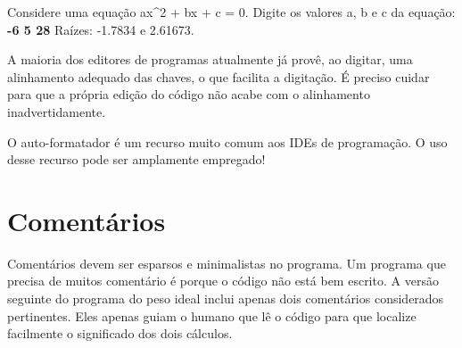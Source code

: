 \documentclass[
  11pt,
  a4paper,
]{scrbook}
\newenvironment{Shaded}{\begin{snugshade}}{\end{snugshade}}
\newcommand{\KeywordTok}[1]{\textcolor[rgb]{0.13,0.29,0.53}{\textbf{#1}}}
\newcommand{\NormalTok}[1]{#1}
\begin{document}
\begin{Shaded}
\begin{Highlighting}[]
\NormalTok{Considere uma equação ax\^{}2 + bx + c = 0.}
\NormalTok{Digite os valores a, b e c da equação: }\KeywordTok{ {-}6 5 28 }
\NormalTok{Raízes: {-}1.7834 e 2.61673.}
\end{Highlighting}
\end{Shaded}

\begin{tcolorbox}[enhanced jigsaw, arc=.35mm, bottomtitle=1mm, colbacktitle=quarto-callout-tip-color!10!white, title=\textcolor{quarto-callout-tip-color}{\faLightbulb}\hspace{0.5em}{Dica}, toprule=.15mm, left=2mm, opacityback=0, colback=white, colframe=quarto-callout-tip-color-frame, opacitybacktitle=0.6, bottomrule=.15mm, leftrule=.75mm, toptitle=1mm, coltitle=black, titlerule=0mm, rightrule=.15mm, breakable]

A maioria dos editores de programas atualmente já provê, ao digitar, uma
alinhamento adequado das chaves, o que facilita a digitação. É preciso
cuidar para que a própria edição do código não acabe com o alinhamento
inadvertidamente.

\end{tcolorbox}

\begin{tcolorbox}[enhanced jigsaw, arc=.35mm, bottomtitle=1mm, colbacktitle=quarto-callout-tip-color!10!white, title=\textcolor{quarto-callout-tip-color}{\faLightbulb}\hspace{0.5em}{Dica}, toprule=.15mm, left=2mm, opacityback=0, colback=white, colframe=quarto-callout-tip-color-frame, opacitybacktitle=0.6, bottomrule=.15mm, leftrule=.75mm, toptitle=1mm, coltitle=black, titlerule=0mm, rightrule=.15mm, breakable]

O auto-formatador é um recurso muito comum aos IDEs de programação. O
uso desse recurso pode ser amplamente empregado!

\end{tcolorbox}

\section{Comentários}\label{comentuxe1rios}

Comentários devem ser esparsos e minimalistas no programa. Um programa
que precisa de muitos comentário é porque o código não está bem escrito.
A versão seguinte do programa do peso ideal inclui apenas dois
comentários considerados pertinentes. Eles apenas guiam o humano que lê
o código para que localize facilmente o significado dos dois cálculos.
\end{document}
